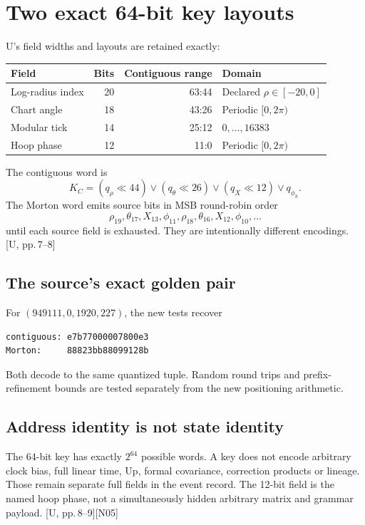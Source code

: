 \documentclass[11pt,a4paper]{article}
\newcommand{\src}[1]{\textcolor{muted}{[U, #1]}}
\newcommand{\dec}[1]{\textcolor{accent}{[N#1]}}
\begin{document}
\section{Two exact 64-bit key layouts}
U's field widths and layouts are retained exactly:
\begin{center}
\begin{tabular}{@{}lrrl@{}}\toprule
\textbf{Field} & \textbf{Bits} & \textbf{Contiguous range} & \textbf{Domain}\\\midrule
Log-radius index &20&63:44&Declared $\rho\in[-20,0]$\\
Chart angle &18&43:26&Periodic $[0,2\pi)$\\
Modular tick &14&25:12&$0,\ldots,16383$\\
Hoop phase &12&11:0&Periodic $[0,2\pi)$\\\bottomrule
\end{tabular}
\end{center}
The contiguous word is
\begin{equation}
K_C=(q_\rho\ll44)\lor(q_\theta\ll26)\lor(q_X\ll12)\lor q_{\phi_h}.
\end{equation}
The Morton word emits source bits in MSB round-robin order
\begin{equation}
\rho_{19},\theta_{17},X_{13},\phi_{11},\rho_{18},\theta_{16},X_{12},\phi_{10},\ldots
\end{equation}
until each source field is exhausted. They are intentionally different encodings.
\src{pp.\,7--8}

\subsection{The source's exact golden pair}
For $(949111,0,1920,227)$, the new tests recover
\begin{lstlisting}
contiguous: e7b77000007800e3
Morton:     88823bb88099128b
\end{lstlisting}
Both decode to the same quantized tuple. Random round trips and prefix-refinement
bounds are tested separately from the new positioning arithmetic.

\subsection{Address identity is not state identity}
The 64-bit key has exactly $2^{64}$ possible words. A key does not encode arbitrary
clock bias, full linear time, Up, formal covariance, correction products or lineage.
Those remain separate full fields in the event record. The 12-bit field is the named
hoop phase, not a simultaneously hidden arbitrary matrix and grammar payload.
\src{pp.\,8--9}\dec{05}
\end{document}
